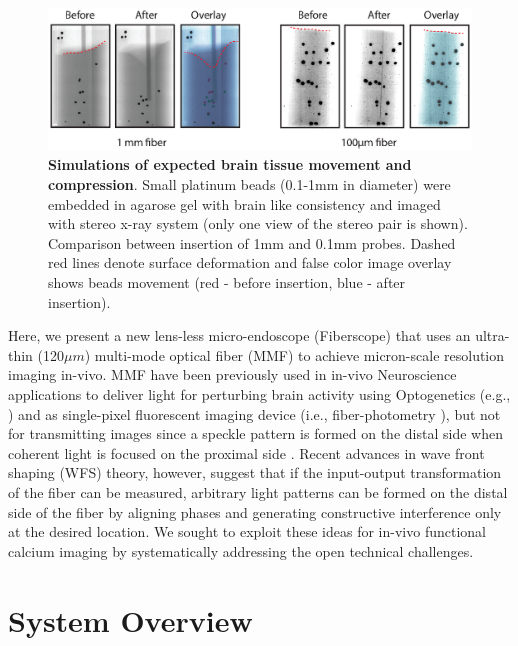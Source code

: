 \documentclass[10pt]{article}
\begin{document}
\begin{figure}[ht!]
\centering\includegraphics[width=15cm]{figure1}
\caption{\textbf{Simulations of expected brain tissue movement and compression}. Small platinum beads (0.1-1mm in diameter) were embedded in agarose gel with brain like consistency and imaged with stereo x-ray system (only one view of the stereo pair is shown). Comparison between  insertion of 1mm and 0.1mm probes. Dashed red lines denote surface deformation and false color image overlay shows beads movement (red - before insertion, blue - after insertion). }
\label{fig:figure1}
\end{figure}



Here, we present a new lens-less micro-endoscope (Fiberscope) that uses an ultra-thin (120$\mu m$) multi-mode optical fiber (MMF) to achieve micron-scale resolution imaging in-vivo. MMF have been previously used in in-vivo Neuroscience applications to deliver light for perturbing brain activity using Optogenetics  (e.g., \cite{Ohayon2013-bh}) and as single-pixel fluorescent imaging device (i.e., fiber-photometry \cite{Kim2016-ut,Gunaydin2014-ns}), but not for transmitting images since a speckle pattern is formed on the distal side when coherent light is focused on the proximal side \cite{Goodman2010-qm}. Recent advances in wave front shaping (WFS) theory, however, suggest that if the input-output transformation of the fiber can be measured, arbitrary light patterns can be formed on the distal side of the fiber by aligning phases and generating constructive interference only at the desired location\cite{Vellekoop2010-sz,Popoff2010-um,Psaltis2013-ov,Cizmar2011-cn,Cizmar2012-ha}. We sought to exploit these ideas for in-vivo functional calcium imaging by systematically addressing the open technical challenges.


\section{System Overview}  \label{system_overview}
\end{document}
